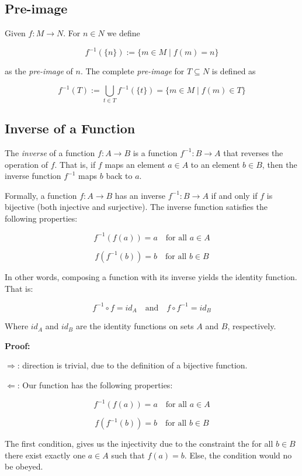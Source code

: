 \subsection{Pre-image}

Given \(f: M \to N\). For \(n \in N\) we define 

\[
	f^{-1}(\{n\}) := \{m \in M \mid f(m) = n\}
\]

as the \emph{pre-image} of \(n\). The complete \emph{pre-image} for 
\(T \subseteq N\) is defined as 

\[
	f^{-1}(T) := \bigcup_{t \in T}f^{-1}(\{t\}) = \{m \in M \mid f(m) \in T\}
\]

\subsection{Inverse of a Function}

The \emph{inverse} of a function \(f: A \to B\) is a function \(f^{-1}: B \to A\) that 
reverses the operation of \(f\). That is, if \(f\) maps an element \(a \in A\) to an 
element \(b \in B\), then the inverse function \(f^{-1}\) maps \(b\) back to \(a\).

Formally, a function \(f: A \to B\) has an inverse \(f^{-1}: B \to A\)  
if and only if \(f\) is bijective (both injective and surjective). The inverse function satisfies the 
following properties:

\[
	f^{-1}(f(a)) = a \quad \text{for all } a \in A
\]

\[
	f(f^{-1}(b)) = b \quad \text{for all } b \in B
\]

In other words, composing a function with its inverse yields the identity function. That is:

\[
	f^{-1} \circ f = id_A \quad \text{and} \quad f \circ f^{-1} = id_B
\]

Where \(id_A\) and \(id_B\) are the identity functions on sets \(A\) and \(B\), respectively.

\textbf{Proof:}

\(\Rightarrow\): direction is trivial, due to the definition of a bijective function. 

\(\Leftarrow\): Our function has the following properties:

\[
	f^{-1}(f(a)) = a \quad \text{for all } a \in A
\]

\[
	f(f^{-1}(b)) = b \quad \text{for all } b \in B
\]

The first condition, gives us the injectivity due to the constraint the for all \(b \in B\) there exist exactly one \(a \in A\)
such that \(f(a) = b\). Else, the condition would no be obeyed.

